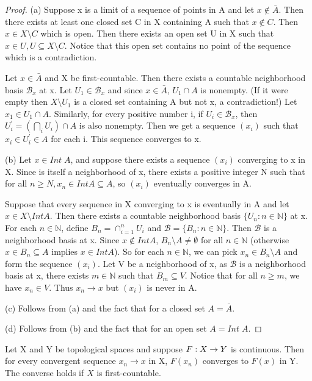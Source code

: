 \documentclass[11pt,a4paper]{article}
\begin{document}
\begin{proof}
    (a) Suppose x is a limit of a sequence of points in A and let $x\notin \bar{A}$. Then there exists at least one closed set C in X containing A such that $x\notin C$. Then $x\in X\setminus C$ which is open. Then there exists an open set U in X such that $x\in U, U\subseteq X\setminus C$. Notice that this open set contains no point of the sequence which is a contradiction. 

    Let $x\in \bar{A}$ and X be first-countable. Then there exists a countable neighborhood basis $\mathcal{B}_x$ at x. Let $U_1\in \mathcal{B}_x$ and since $x\in \bar{A}$, $U_1\cap A$ is nonempty. (If it were empty then $X\setminus U_1$ is a closed set containing A but not x,  a contradiction!) Let $x_1\in U_1\cap A$. Similarly, for every positive number i, if $U_i\in \mathcal{B}_x$, then $U_i^\prime = (\bigcap_i U_i)\cap A$ is also nonempty. Then we get a sequence $(x_i)$ such that $x_i\in U_i^\prime\in A$ for each i. This sequence converges to x.
    
    (b) Let $x\in Int\;A$, and suppose there exists a sequence $(x_i)$ converging to x in X. Since  is itself a neighborhood of x, there exists a positive integer N such that for all $n\ge N, x_n\in Int A\subseteq A$, so $(x_i)$ eventually converges in A.

    Suppose that every sequence in X converging to x is eventually in A and let $x\in X\setminus Int A$. Then there exists a countable neighborhood basis $\{U_n : n\in\mathbb{N}\}$ at x. For each $n\in\mathbb{N}$, define $B_n = \cap_{i=1}^n U_i$ and $\mathcal{B}=\{B_n : n\in\mathbb{N}\}$. Then $\mathcal{B}$ is a neighborhood basis at x. Since $x\notin Int A$, $B_n\setminus A \neq \emptyset$ for all $n\in \mathbb{N}$ (otherwise  $x\in B_n\subseteq A$ implies $x\in Int A$). So for each $n\in \mathbb{N}$, we can pick $x_n\in B_n\setminus A$ and form the sequence $(x_i)$. Let V be a neighborhood of x, as $\mathcal{B}$ is a neighborhood basis at x, there exists $m\in \mathbb{N}$ such that $B_m\subseteq V$. Notice that for all $n\ge m$, we have $x_n\in V$. Thus $x_n\rightarrow x$ but $(x_i)$ is never in A. 

    (c) Follows from (a) and the fact that for a closed set $A=\bar{A}$.

    (d) Follows from (b) and the fact that for an open set $A=Int\;A$.
\end{proof}

\begin{prop}
    Let X and Y be topological spaces and suppose $F:X\rightarrow Y$ is continuous. Then for every convergent sequence $x_n\rightarrow x$ in X, $F(x_n)$ converges to $F(x)$ in Y. The converse holds if $X$ is first-countable.
\end{prop}
\end{document}
